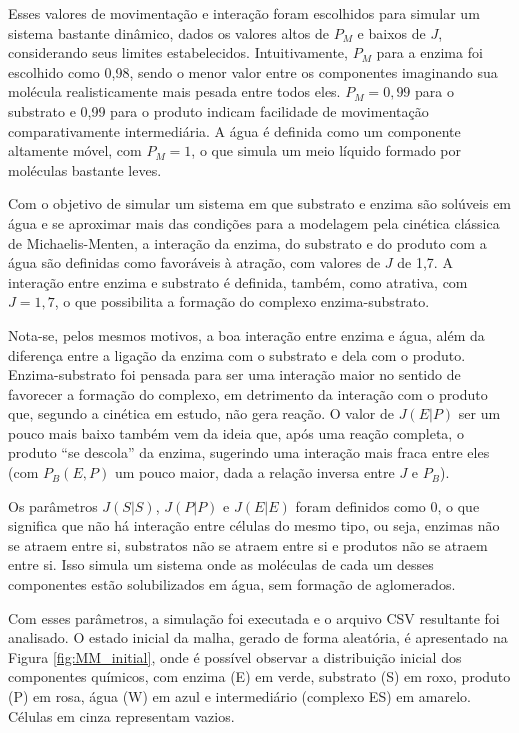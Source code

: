 \documentclass[12pt,oneside]{report}
\begin{document}
Esses valores de movimentação e interação foram escolhidos para simular um sistema bastante dinâmico, dados os valores altos de $P_M$ e baixos de $J$, considerando seus limites estabelecidos. Intuitivamente, $P_M$ para a enzima foi escolhido como 0{,}98, sendo o menor valor entre os componentes imaginando sua molécula realisticamente mais pesada entre todos eles. $P_M = 0{,}99$ para o substrato e 0{,}99 para o produto indicam facilidade de movimentação comparativamente intermediária. A água é definida como um componente altamente móvel, com $P_M = 1$, o que simula um meio líquido formado por moléculas bastante leves.

Com o objetivo de simular um sistema em que substrato e enzima são solúveis em água e se aproximar mais das condições para a modelagem pela cinética clássica de Michaelis-Menten, a interação da enzima, do substrato e do produto com a água são definidas como favoráveis à atração, com valores de $J$ de 1{,}7. A interação entre enzima e substrato é definida, também, como atrativa, com $J = 1{,}7$, o que possibilita a formação do complexo enzima-substrato.

Nota-se, pelos mesmos motivos, a boa interação entre enzima e água, além da diferença entre a ligação da enzima com o substrato e dela com o produto. Enzima-substrato foi pensada para ser uma interação maior no sentido de favorecer a formação do complexo, em detrimento da interação com o produto que, segundo a cinética em estudo, não gera reação. O valor de $J (E|P)$ ser um pouco mais baixo também vem da ideia que, após uma reação completa, o produto ``se descola'' da enzima, sugerindo uma interação mais fraca entre eles (com $P_B (E,P)$ um pouco maior, dada a relação inversa entre $J$ e $P_B$).

Os parâmetros $J (S|S)$, $J (P|P)$ e $J (E|E)$ foram definidos como 0, o que significa que não há interação entre células do mesmo tipo, ou seja, enzimas não se atraem entre si, substratos não se atraem entre si e produtos não se atraem entre si. Isso simula um sistema onde as moléculas de cada um desses componentes estão solubilizados em água, sem formação de aglomerados.

Com esses parâmetros, a simulação foi executada e o arquivo CSV resultante foi analisado. O estado inicial da malha, gerado de forma aleatória, é apresentado na Figura \ref{fig:MM_initial}, onde é possível observar a distribuição inicial dos componentes químicos, com enzima (E) em verde, substrato (S) em roxo, produto (P) em rosa, água (W) em azul e intermediário (complexo ES) em amarelo. Células em cinza representam vazios.
\end{document}
